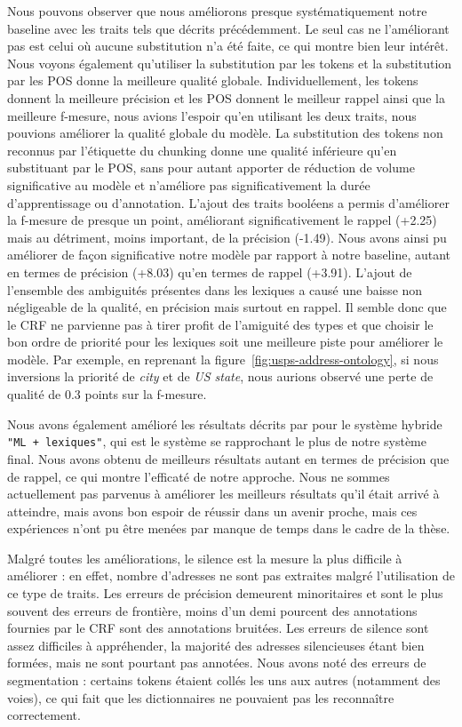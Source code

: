 \documentclass[PhD-Yoann-Dupont.tex]{subfiles}
\begin{document}
Nous pouvons observer que nous améliorons presque systématiquement notre baseline avec les traits tels que décrits précédemment. Le seul cas ne l'améliorant pas est celui où aucune substitution n'a été faite, ce qui montre bien leur intérêt. Nous voyons également qu'utiliser la substitution par les tokens et la substitution par les POS donne la meilleure qualité globale. Individuellement, les tokens donnent la meilleure précision et les POS donnent le meilleur rappel ainsi que la meilleure f-mesure, nous avions l'espoir qu'en utilisant les deux traits, nous pouvions améliorer la qualité globale du modèle. La substitution des tokens non reconnus par l'étiquette du chunking donne une qualité inférieure qu'en substituant par le POS, sans pour autant apporter de réduction de volume significative au modèle et n'améliore pas significativement la durée d'apprentissage ou d'annotation. L'ajout des traits booléens a permis d'améliorer la f-mesure de presque un point, améliorant significativement le rappel (+2.25) mais au détriment, moins important, de la précision (-1.49). Nous avons ainsi pu améliorer de façon significative notre modèle par rapport à notre baseline, autant en termes de précision (+8.03) qu'en termes de rappel (+3.91). L'ajout de l'ensemble des ambiguités présentes dans les lexiques a causé une baisse non négligeable de la qualité, en précision mais surtout en rappel. Il semble donc que le CRF ne parvienne pas à tirer profit de l'amiguité des types et que choisir le bon ordre de priorité pour les lexiques soit une meilleure piste pour améliorer le modèle. Par exemple, en reprenant la figure\ \ref{fig:usps-address-ontology}, si nous inversions la priorité de \emph{city} et de \emph{US state}, nous aurions observé une perte de qualité de 0.3 points sur la f-mesure.

Nous avons également amélioré les résultats décrits par \citet{yu2007high} pour le système hybride \texttt{"ML + lexiques"}, qui est le système se rapprochant le plus de notre système final. Nous avons obtenu de meilleurs résultats autant en termes de précision que de rappel, ce qui montre l'efficaté de notre approche. Nous ne sommes actuellement pas parvenus à améliorer les meilleurs résultats qu'il était arrivé à atteindre, mais avons bon espoir de réussir dans un avenir proche, mais ces expériences n'ont pu être menées par manque de temps dans le cadre de la thèse.

Malgré toutes les améliorations, le silence est la mesure la plus difficile à améliorer : en effet, nombre d'adresses ne sont pas extraites malgré l'utilisation de ce type de traits. Les erreurs de précision demeurent minoritaires et sont le plus souvent des erreurs de frontière, moins d'un demi pourcent des annotations fournies par le CRF sont des annotations bruitées. Les erreurs de silence sont assez difficiles à appréhender, la majorité des adresses silencieuses étant bien formées, mais ne sont pourtant pas annotées. Nous avons noté des erreurs de segmentation : certains tokens étaient collés les uns aux autres (notamment des voies), ce qui fait que les dictionnaires ne pouvaient pas les reconnaître correctement.
\end{document}
